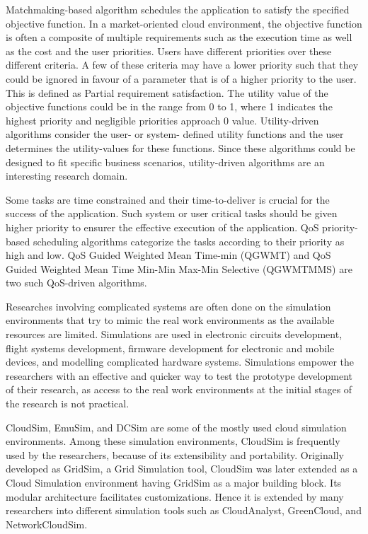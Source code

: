 \documentclass[times, 10pt,twocolumn]{article}
\begin{document}
Matchmaking-based algorithm schedules the application to satisfy the specified objective function. In a market-oriented cloud environment, the objective function is often a composite of multiple requirements such as the execution time as well as the cost and the user priorities. Users have different priorities over these different criteria. A few of these criteria may have a lower priority such that they could be ignored in favour of a parameter that is of a higher priority to the user. This is defined as Partial requirement satisfaction. The utility value of the objective functions could be in the range from 0 to 1, where 1 indicates the highest priority and negligible priorities approach 0 value. Utility-driven algorithms consider the user- or system- defined utility functions and the user determines the utility-values for these functions. Since these algorithms could be designed to fit specific business scenarios, utility-driven algorithms are an interesting research domain.

Some tasks are time constrained and their time-to-deliver is crucial for the success of the application. Such system or user critical tasks should be given higher priority to ensurer the effective execution of the application. QoS priority-based scheduling algorithms categorize the tasks according to their priority as high and low. QoS Guided Weighted Mean Time-min (QGWMT) and QoS Guided Weighted Mean Time Min-Min Max-Min Selective (QGWMTMMS) are two such QoS-driven algorithms\cite{qosgrid}. 


Researches involving complicated systems are often done on the simulation environments that try to mimic the real work environments as the available resources are limited. Simulations are used in electronic circuits development, flight systems development, firmware development for electronic and mobile devices, and modelling complicated hardware systems. Simulations empower the researchers with an effective and quicker way to test the prototype development of their research, as access to the real work environments at the initial stages of the research is not practical.

CloudSim, EmuSim\cite{emusim}, and DCSim\cite{dcsim} are some of the mostly used cloud simulation environments. Among these simulation environments, CloudSim is frequently used by the researchers, because of its extensibility and portability. Originally developed as GridSim, a Grid Simulation tool, CloudSim was later extended as a Cloud Simulation environment having GridSim as a major building block\cite{cloudgridsim}. Its modular architecture facilitates customizations. Hence it is extended by many researchers into different simulation tools such as CloudAnalyst\cite{cloudanalyst}, GreenCloud\cite{greencloud}, and NetworkCloudSim\cite{ncloudsim}. 
\end{document}
